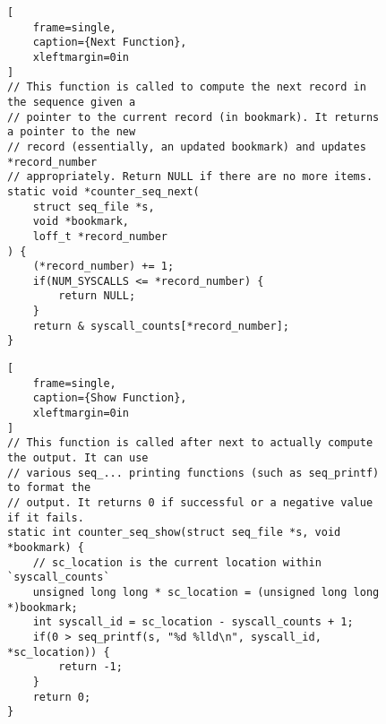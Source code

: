 \documentclass{article}
\begin{document}
\begin{figure}[tbhp] %
\label{fig:next-function}
\begin{lstlisting}[
    frame=single,
    caption={Next Function},
    xleftmargin=0in
]
// This function is called to compute the next record in the sequence given a
// pointer to the current record (in bookmark). It returns a pointer to the new
// record (essentially, an updated bookmark) and updates *record_number
// appropriately. Return NULL if there are no more items.
static void *counter_seq_next(
    struct seq_file *s,
    void *bookmark,
    loff_t *record_number
) {
    (*record_number) += 1;
    if(NUM_SYSCALLS <= *record_number) {
        return NULL;
    }
    return & syscall_counts[*record_number];
}
\end{lstlisting}
\end{figure}

\begin{figure}[tbhp] %
\label{fig:show-function}
\begin{lstlisting}[
    frame=single,
    caption={Show Function},
    xleftmargin=0in
]
// This function is called after next to actually compute the output. It can use
// various seq_... printing functions (such as seq_printf) to format the
// output. It returns 0 if successful or a negative value if it fails.
static int counter_seq_show(struct seq_file *s, void *bookmark) {
    // sc_location is the current location within `syscall_counts`
    unsigned long long * sc_location = (unsigned long long *)bookmark;
    int syscall_id = sc_location - syscall_counts + 1;
    if(0 > seq_printf(s, "%d %lld\n", syscall_id, *sc_location)) {
        return -1;
    }
    return 0;
}
\end{lstlisting}
\end{figure}
\end{document}
